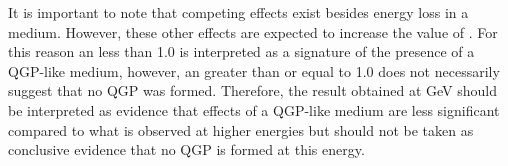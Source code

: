 	It is important to note that competing effects exist besides energy loss in a medium. However, these other effects are expected to increase the value of \rcp. For this reason an \rcp less than 1.0 is interpreted as a signature of the presence of a QGP-like medium, however, an \rcp greater than or equal to 1.0 does not necessarily suggest that no QGP was formed. Therefore, the \rcp result obtained at  GeV should be interpreted as evidence that effects of a QGP-like medium are less significant compared to what is observed at higher \snn energies but should not be taken as conclusive evidence that no QGP is formed at this energy.
